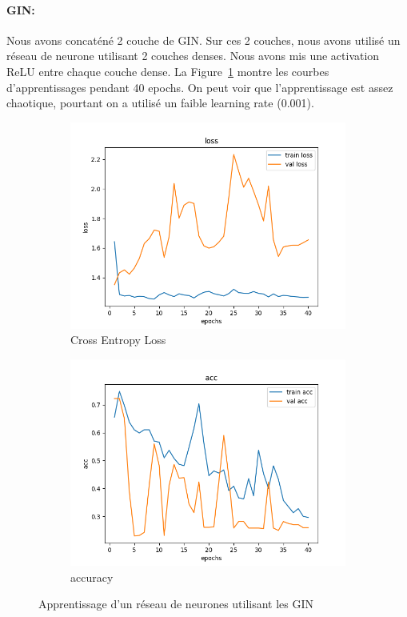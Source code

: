 \documentclass[a4paper]{article}
\begin{document}
\paragraph{GIN:}
Nous avons concaténé 2 couche de GIN. Sur ces 2 couches, nous avons utilisé un réseau de neurone utilisant 2 couches denses. Nous 
avons mis une activation ReLU entre chaque couche dense. La Figure~\ref{fig: GIN} montre les courbes d'apprentissages pendant
40 epochs. On peut voir que l'apprentissage est assez chaotique, pourtant on a utilisé un faible learning rate (0.001).

\begin{figure}[ht]
    \begin{subfigure}{0.47\textwidth}
      \includegraphics[width=\linewidth]{../results/GIN_3/loss.png}
      \caption{Cross Entropy Loss}
    \end{subfigure}
    \hfill
    \begin{subfigure}{0.47\textwidth}
      \includegraphics[width=\linewidth]{../results/GIN_3/acc.png}
      \caption{accuracy}
    \end{subfigure}
    \caption{Apprentissage d'un réseau de neurones utilisant les GIN}
    \label{fig: GIN}
\end{figure}
\end{document}
